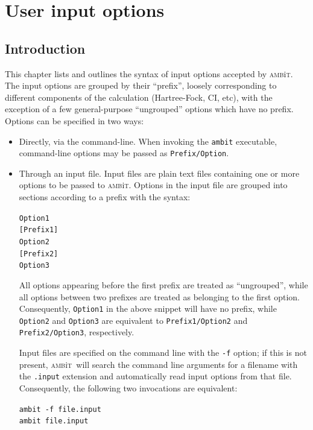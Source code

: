 \documentclass{report}
\newcommand{\ambit}{\textsc{amb}{\footnotesize i}\textsc{t}}
\begin{document}
\chapter{User input options}
\label{chap:input}

\section{Introduction}

This chapter lists and outlines the syntax of input options accepted by \ambit. The input options are
grouped by their ``prefix'', loosely corresponding to different components of the calculation
(Hartree-Fock, CI, etc), with the exception of a few general-purpose ``ungrouped'' options which have no
prefix. Options can be specified in two ways:
\begin{itemize}
\item Directly, via the command-line. When invoking the \texttt{ambit} executable, command-line options 
may be passed as \texttt{Prefix/Option}.
\item Through an input file. Input files are plain text files containing one or more options to be
passed to \ambit. Options in the input file are grouped into sections according to a prefix with the
syntax:

\texttt{Option1}
\smallskip\\
\texttt{[Prefix1]}\\
\texttt{Option2}
\smallskip\\
\texttt{[Prefix2]}\\
\texttt{Option3}

All options appearing before the first prefix are treated as ``ungrouped'', while all options between
two prefixes are treated as belonging to the first option. Consequently, \texttt{Option1} in the above
snippet will have no prefix, while \texttt{Option2} and \texttt{Option3} are equivalent to
\texttt{Prefix1/Option2} and \texttt{Prefix2/Option3}, respectively.

Input files are specified on the command line with the \texttt{-f} option; if this is not present,
\ambit\ will search the command line arguments for a filename with the \texttt{.input} extension and
automatically read input options from that file. Consequently, the following two invocations are
equivalent:

\texttt{ambit -f file.input}\\
\texttt{ambit file.input}
\end{itemize}
\end{document}
